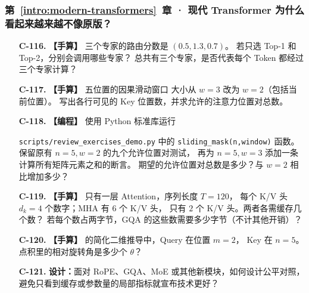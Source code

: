 \subsubsection*{第~\ref*{intro:modern-transformers}~章 · 现代 Transformer 为什么看起来越来越不像原版？}
\begin{enumerate}[label={},leftmargin=4.8em,itemsep=4pt]
\item[\textbf{C-116.}] \leavevmode{}\label{exercise:C-116}\label{exercise:moe-routing}\textbf{【手算】} 三个专家的路由分数是 $(0.5,1.3,0.7)$。
若只选 Top-1 和 Top-2，分别会调用哪些专家？
总共有三个专家，是否代表每个 Token 都经过三个专家计算？
\item[\textbf{C-117.}] \leavevmode{}\label{exercise:C-117}\label{exercise:sliding-window-pairs}\textbf{【手算】} 五位置的因果滑动窗口
大小从 $w=3$ 改为 $w=2$（包括当前位置）。
写出各行可见的 Key 位置数，并求允许的注意力位置对总数。
\item[\textbf{C-118.}] \leavevmode{}\label{exercise:C-118}\label{exercise:sliding-window-code}\textbf{【编程】} 使用 Python 标准库运行
\par\noindent
\nolinkurl{scripts/review_exercises_demo.py} 中的
\texttt{sliding\_mask(n,window)} 函数。
保留原有 $n=5,w=2$ 的九个允许位置对测试，
再为 $n=5,w=3$ 添加一条计算所有矩阵元素之和的断言。
期望的允许位置对总数是多少？与 $w=2$ 相比增加多少？
\item[\textbf{C-119.}] \leavevmode{}\label{exercise:C-119}\label{exercise:gqa-cache-ratio}\textbf{【手算】} 只有一层 Attention，序列长度 $T=120$，
每个 K/V 头 $d_k=4$ 个数字；MHA 有 $6$ 个 K/V 头，
 只有 $2$ 个 K/V 头。两者各需缓存几个数？
若每个数占两字节，GQA 的这些数需要多少字节（不计其他开销）？
\item[\textbf{C-120.}] \leavevmode{}\label{exercise:C-120}\label{exercise:rope-relative-position}\textbf{【手算】}  的简化二维推导中，Query 在位置 $m=2$，
Key 在 $n=5$。点积里的相对旋转角是多少个 $\theta$？
\item[\textbf{C-121.}] \leavevmode{}\label{exercise:C-121}\label{exercise:architecture-fair-comparison}\textbf{设计：}面对 RoPE、GQA、MoE 或其他新模块，如何设计公平对照，避免只看到缓存或参数量的局部指标就宣布技术更好？
\end{enumerate}
